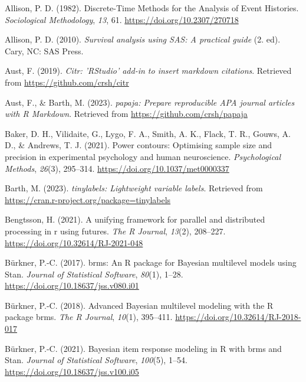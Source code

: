 \documentclass[
  man,floatsintext]{apa6}
\newlength{\cslhangindent}
\newenvironment{CSLReferences}[2] %
 {\begin{list}{}{%
  \setlength{\itemindent}{0pt}
  \setlength{\leftmargin}{0pt}
  \setlength{\parsep}{0pt}
  \ifodd #1
   \setlength{\leftmargin}{\cslhangindent}
   \setlength{\itemindent}{-1\cslhangindent}
  \fi
  \setlength{\itemsep}{#2\baselineskip}}}
 {\end{list}}
\begin{document}
\label{refs}
\begin{CSLReferences}{1}{0}
Allison, P. D. (1982). Discrete-{Time Methods} for the {Analysis} of {Event Histories}. \emph{Sociological Methodology}, \emph{13}, 61. \url{https://doi.org/10.2307/270718}

Allison, P. D. (2010). \emph{Survival analysis using {SAS}: A practical guide} (2. ed). Cary, NC: SAS Press.

Aust, F. (2019). \emph{Citr: 'RStudio' add-in to insert markdown citations}. Retrieved from \url{https://github.com/crsh/citr}

Aust, F., \& Barth, M. (2023). \emph{{papaja}: {Prepare} reproducible {APA} journal articles with {R Markdown}}. Retrieved from \url{https://github.com/crsh/papaja}

Baker, D. H., Vilidaite, G., Lygo, F. A., Smith, A. K., Flack, T. R., Gouws, A. D., \& Andrews, T. J. (2021). Power contours: {Optimising} sample size and precision in experimental psychology and human neuroscience. \emph{Psychological Methods}, \emph{26}(3), 295--314. \url{https://doi.org/10.1037/met0000337}

Barth, M. (2023). \emph{{tinylabels}: Lightweight variable labels}. Retrieved from \url{https://cran.r-project.org/package=tinylabels}

Bengtsson, H. (2021). A unifying framework for parallel and distributed processing in r using futures. \emph{The R Journal}, \emph{13}(2), 208--227. \url{https://doi.org/10.32614/RJ-2021-048}

Bürkner, P.-C. (2017). {brms}: An {R} package for {Bayesian} multilevel models using {Stan}. \emph{Journal of Statistical Software}, \emph{80}(1), 1--28. \url{https://doi.org/10.18637/jss.v080.i01}

Bürkner, P.-C. (2018). Advanced {Bayesian} multilevel modeling with the {R} package {brms}. \emph{The R Journal}, \emph{10}(1), 395--411. \url{https://doi.org/10.32614/RJ-2018-017}

Bürkner, P.-C. (2021). Bayesian item response modeling in {R} with {brms} and {Stan}. \emph{Journal of Statistical Software}, \emph{100}(5), 1--54. \url{https://doi.org/10.18637/jss.v100.i05}


\end{CSLReferences}
\end{document}
